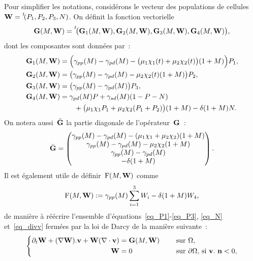 \documentclass[main.tex]{subfiles}
\begin{document}
Pour simplifier les notations, considérons le vecteur des populations de cellules~${\bf W}=\prescript{\mathit{t\!}}{}{(P_1, P_2, P_3, N)}$. On définit la fonction vectorielle 
\begin{equation}
{\bf G}(M,{\bf W}) = \prescript{\mathit{t\!}}{}{\big({\bf G}_1(M,{\bf W}), {\bf G}_2(M,{\bf W}), {\bf G}_3(M,{\bf W}), {\bf G}_4(M,{\bf W}) \big)},
\end{equation}
dont les composantes sont données par~:
\begin{align}
{\bf G}_1(M,{\bf W}) &= \Big(\gamma_{pp}(M)- \gamma_{pd}(M) - \big(\mu_1 \chi_1 (t)+\mu_2 \chi_2(t) \big)(1+M)\Big) P_1, \\
{\bf G}_2(M,{\bf W}) &= \big(\gamma_{pp}(M)- \gamma_{pd}(M) - \mu_2 \chi_2(t) (1+M)\big)P_2, \\
{\bf G}_3(M,{\bf W}) &= \big(\gamma_{pp}(M) - \gamma_{pd}(M) \big)P_3, \\
{\bf G}_4(M,{\bf W}) &= \gamma_{pd}(M) P +\gamma_{sd}(M) (1-P-N)  \nonumber \\
&\qquad +\big( \mu_1 \chi_1 P_1 + \mu_2\chi_2 (P_1+P_2) \big) (1+M) - \delta(1+M)N.
\end{align}
On notera aussi~$\bar{{\bf G}}$ la partie diagonale de l'opérateur~${\bf G}$~:
\begin{equation}\label{eq:GG_bar}
\bar{{\bf G}} = \begin{pmatrix}
\gamma_{pp}(M)- \gamma_{pd}(M) - (\mu_1 \chi_1 +\mu_2 \chi_2 )(1+M) \\
\gamma_{pp}(M)- \gamma_{pd}(M) - \mu_2 \chi_2 (1+M) \\
\gamma_{pp}(M) - \gamma_{pd}(M) \\
- \delta(1+M)
\end{pmatrix}.
\end{equation}
Il est également utile de définir~${\rm F}(M,{\bf W})$ comme
\begin{align}
  \label{eq_F}
  {\rm F}(M,{\bf W}):=\gamma_{pp}(M)\sum_{i=1}^3W_i-\delta(1+M)W_4,
\end{align}
de manière à réécrire l'ensemble d'équations~\eqref{eq_P1}-\eqref{eq_P3}, \eqref{eq_N} et~\eqref{eq_divv} fermées par la loi de Darcy de la manière suivante~:
\begin{equation}\label{eq_transport_pop}
\left\{
\begin{aligned}
\partial_t {\bf W} + (\nabla {\bf W}).\mathbf{v} + {\bf W} (\nabla\cdot \mathbf{v}) &= {\bf G}(M,{\bf W}) & \quad \textrm{ sur } & \Omega, \\
{\bf W} &=0 & \quad \textrm{ sur } & \partial \Omega \textrm{, si } \mathbf{v}.\ {\bf n}<0 ,
\end{aligned}
\right.
\end{equation}
\end{document}
